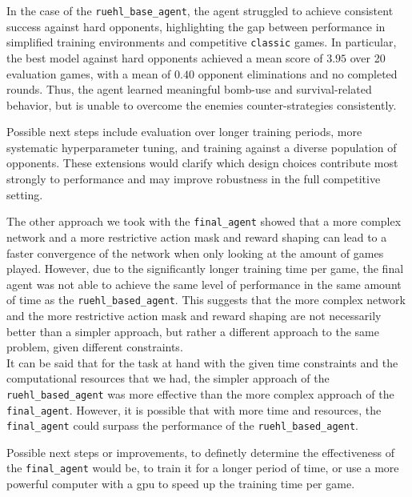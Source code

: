 \documentclass[11pt,a4paper]{article}
\begin{document}
In the case of the \texttt{ruehl\_base\_agent}, the agent struggled to achieve consistent success against hard opponents, highlighting the gap between performance in simplified training environments and competitive \texttt{classic} games.
In particular, the best model against hard opponents achieved a mean score of $3.95$ over 20 evaluation games, with a mean of $0.40$ opponent eliminations and no completed rounds.  
Thus, the agent learned meaningful bomb-use and survival-related behavior, but is unable to overcome the enemies counter-strategies consistently.

Possible next steps include evaluation over longer training periods, more systematic hyperparameter tuning, and training against a diverse population of opponents. These extensions would clarify which design choices contribute most strongly to performance and may improve robustness in the full competitive setting.

The other approach we took with the \texttt{final\_agent} showed that a more complex network and a more restrictive action mask and reward shaping can lead to a faster convergence of the network when only looking at the amount of games played. However, due to the significantly longer training time per game, the final agent was not able to achieve the same level of performance in the same amount of time as the \texttt{ruehl\_based\_agent}. This suggests that the more complex network and the more restrictive action mask and reward shaping are not necessarily better than a simpler approach, but rather a different approach to the same problem, given different constraints.\\
It can be said that for the task at hand with the given time constraints and the computational resources that we had, the simpler approach of the \texttt{ruehl\_based\_agent} was more effective than the more complex approach of the \texttt{final\_agent}. However, it is possible that with more time and resources, the \texttt{final\_agent} could surpass the performance of the \texttt{ruehl\_based\_agent}.

Possible next steps or improvements, to definetly determine the effectiveness of the \texttt{final\_agent} would be, to train it for a longer period of time, or use a more powerful computer with a gpu to speed up the training time per game.


\FloatBarrier


\end{document}
